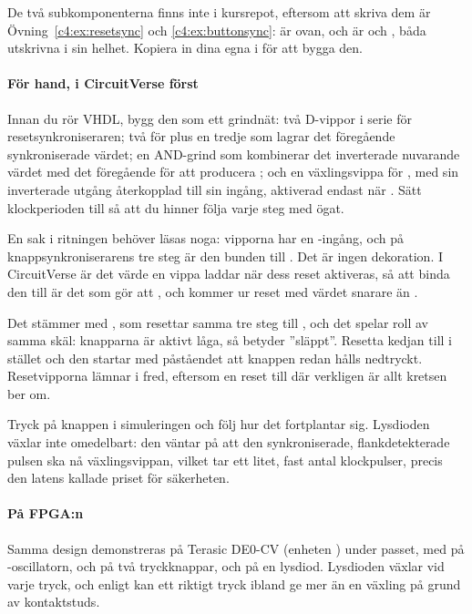 De två subkomponenterna finns inte i kursrepot, eftersom att skriva dem är
Övning~\ref{c4:ex:resetsync} och \ref{c4:ex:buttonsync}:  är
 ovan, och  är  och
, båda utskrivna i sin helhet. Kopiera in dina egna i
 för att bygga den.

\paragraph{För hand, i CircuitVerse först}
Innan du rör VHDL, bygg den som ett grindnät: två D-vippor i serie för resetsynkroniseraren; två
för  plus en tredje som lagrar det föregående synkroniserade värdet; en AND-grind
som kombinerar det inverterade nuvarande värdet med det föregående för att producera
; och en växlingsvippa för , med sin inverterade utgång
återkopplad till sin ingång, aktiverad endast när . Sätt klockperioden
till  så att du hinner följa varje steg med ögat.


En sak i ritningen behöver läsas noga: vipporna har en -ingång, och på
knappsynkroniserarens tre steg är den bunden till . Det är ingen dekoration. I CircuitVerse
är  det värde en vippa laddar när dess reset aktiveras, så att binda den till 
är det som gör att ,  och  kommer ur reset
med värdet  snarare än .

Det stämmer med , som resettar samma tre steg till , och
det spelar roll av samma skäl: knapparna är aktivt låga, så  betyder ”släppt”. Resetta
kedjan till  i stället och den startar med påståendet att knappen redan hålls nedtryckt.
Resetvipporna lämnar  i fred, eftersom en reset till  där verkligen är allt
kretsen ber om.

Tryck på knappen i simuleringen och följ hur det fortplantar sig. Lysdioden växlar inte omedelbart:
den väntar på att den synkroniserade, flankdetekterade pulsen ska nå växlingsvippan, vilket tar ett
litet, fast antal klockpulser, precis den latens  kallade priset för säkerheten.

\paragraph{På FPGA:n}
Samma design demonstreras på Terasic DE0-CV (enheten ) under passet, med
 på -oscillatorn,  och  på två tryckknappar,
och  på en lysdiod. Lysdioden växlar vid varje tryck, och enligt
 kan ett riktigt tryck ibland ge mer än en växling på grund av
kontaktstuds.
